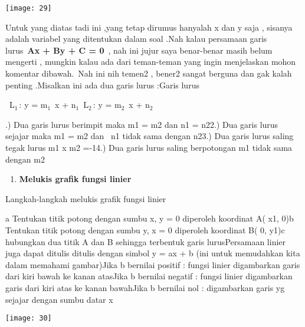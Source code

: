 \documentclass[11pt,fleqn]{book} %
\begin{document}
\begin{myEnumerate}
\begin{itemize}
\noindent 

\begin{center}
\noindent \texttt{[image: 29]}
\end{center}

\noindent Untuk yang diatas tadi ini ,yang tetap dirumus hanyalah x dan y saja , sisanya adalah variabel yang ditentukan dalam soal .Nah kalau persamaan garis lurus~\textbf{Ax + By + C = 0}~, nah ini jujur saya benar-benar masih belum mengerti , mungkin kalau ada dari teman-teman yang ingin menjelaskan mohon komentar dibawah.~Nah ini nih temen2 , bener2 sangat berguna dan gak kalah penting .Misalkan ini ada dua garis lurus :Garis lurus~

\noindent ~L${}_{1~}$: y = m${}_{1}$~x + n${}_{1}$~L${}_{2~}$: y = m${}_{2}$~x + n${}_{2~~}$

.) Dua garis lurus berimpit maka m1 = m2 dan n1 = n22.) Dua garis lurus sejajar maka m1 = m2 dan ~n1 tidak sama dengan n23.) Dua garis lurus saling tegak lurus m1 x m2 =-14.) Dua garis lurus saling berpotongan m1 tidak sama dengan m2

\noindent 

\begin{enumerate}
\item  \textbf{Melukis grafik fungsi linier}
\end{enumerate}

\noindent Langkah-langkah melukis grafik fungsi linier

\noindent a Tentukan titik potong dengan sumbu x, y = 0 diperoleh koordinat A( x1, 0)b Tentukan titik potong dengan sumbu y, x = 0 diperoleh koordinat B( 0, y1)c hubungkan dua titik A dan B sehingga terbentuk garis lurusPersamaan linier juga dapat ditulis ditulis dengan simbol y = ax + b (ini untuk memudahkan kita dalam memahami gambar)Jika b bernilai positif : fungsi linier digambarkan garis dari kiri bawah ke kanan atasJika b bernilai negatif : fungsi linier digambarkan garis dari kiri atas ke kanan bawahJika b bernilai nol : digambarkan garis yg sejajar dengan sumbu datar x

\begin{center}
\noindent \texttt{[image: 30]}
\end{center}

\noindent ~

\noindent 

\noindent 

\noindent 


\end{itemize}
\end{myEnumerate}
\end{document}
